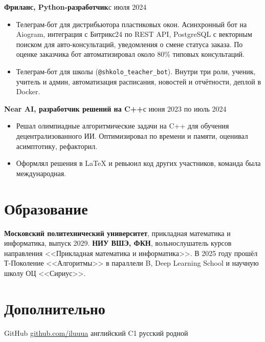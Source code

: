 \documentclass[10pt,a4paper]{article}
\newcommand{\role}[2]{\textbf{#1}\hfill #2\par}
\begin{document}
\role{Фриланс, Python-разработчик}{с июля 2024}
\begin{itemize}
  \item Телеграм-бот для дистрибьютора пластиковых окон. Асинхронный бот на Aiogram, интеграция с Битрикс24
        по REST API, PostgreSQL с векторным поиском для авто-консультаций, уведомления о смене статуса заказа.
        По оценке заказчика бот автоматизировал около 80\% типовых консультаций.
  \item Телеграм-бот для школы (\texttt{@shkolo\_teacher\_bot}). Внутри три роли, ученик, учитель и админ,
        автоматизация расписания, новостей и отчётности, деплой в Docker.
\end{itemize}
\vspace{3pt}

\role{Near AI, разработчик решений на C++}{с июня 2023 по июль 2024}
\begin{itemize}
  \item Решал олимпиадные алгоритмические задачи на C++ для обучения децентрализованного ИИ. Оптимизировал
        по времени и памяти, оценивал асимптотику, рефакторил.
  \item Оформлял решения в LaTeX и ревьюил код других участников, команда была международная.
\end{itemize}

\section{Образование}
\textbf{Московский политехнический университет}, прикладная математика и информатика, выпуск 2029.
\textbf{НИУ ВШЭ, ФКН}, вольнослушатель курсов направления <<Прикладная математика и информатика>>.
В 2025 году прошёл Т-Поколение <<Алгоритмы>> в параллели B, Deep Learning School и научную школу ОЦ <<Сириус>>.

\section{Дополнительно}
GitHub \href{https://github.com/iluuua}{github.com/iluuua} \textperiodcentered{} английский C1
\textperiodcentered{} русский родной
\end{document}
